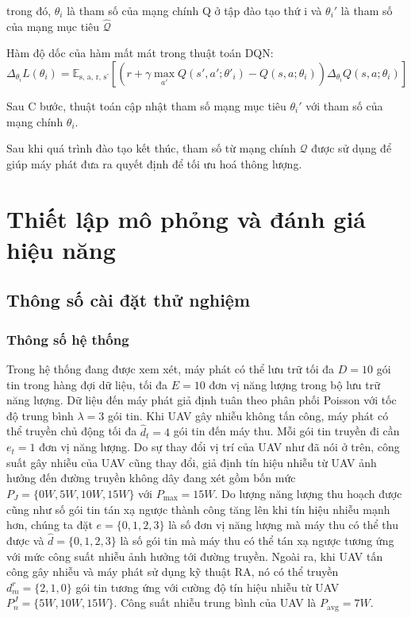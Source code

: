 \documentclass{uetgraduation}
\begin{document}
trong đó, $\theta_i$ là tham số của mạng chính Q ở tập đào tạo thứ i và $\theta_i'$ là tham số của mạng mục tiêu $\hat{\mathcal{Q}}$

Hàm độ dốc của hàm mất mát trong thuật toán DQN:
\begin{equation}
    \Delta_{\theta_i} L(\theta_i) = \mathbb{E}_\text{s, a, r, s'} [(r + \gamma \max_{a'} Q(s', a'; \theta'_i) - Q(s, a; \theta_i)) \Delta_{\theta_i} Q(s, a; \theta_i)] 
\end{equation}

Sau C bước, thuật toán cập nhật tham số mạng mục tiêu $\theta_i'$ với tham số của mạng chính $\theta_i$.

Sau khi quá trình đào tạo kết thúc, tham số từ mạng chính $\mathcal{Q}$ được sử dụng để giúp máy phát đưa ra quyết định để tối ưu hoá thông lượng.

\chapter{Thiết lập mô phỏng và đánh giá hiệu năng}
\section{Thông số cài đặt thử nghiệm}
\subsection{Thông số hệ thống}
Trong hệ thống đang được xem xét, máy phát có thể lưu trữ tối đa $D = 10$ gói tin trong hàng đợi dữ liệu, tối đa $E = 10$ đơn vị năng lượng
trong bộ lưu trữ năng lượng. Dữ liệu đến máy phát giả định tuân theo phân phối Poisson với tốc độ trung bình $\lambda = 3$ 
gói tin. Khi UAV gây nhiễu không tấn công, máy phát có thể truyền chủ động tối đa $\hat{d}_t = 4$ gói tin đến máy thu. Mỗi gói tin truyền đi cần
$e_t = 1$ đơn vị năng lượng. Do sự thay đổi vị trí của UAV như đã nói ở trên, công suất gây nhiễu của UAV cũng thay đổi, giả định tín hiệu nhiễu từ 
UAV ảnh hưởng đến đường truyền không dây đang xét gồm bốn mức $P_J = \{0W, 5W, 10W, 15W\}$ với $P_{\text{max}} = 15W$. Do lượng năng lượng
thu hoạch được cũng như số gói tin tán xạ ngược thành công tăng lên khi tín hiệu nhiễu mạnh hơn, chúng ta đặt $e = \{0, 1, 2, 3\}$ là số đơn vị
năng lượng mà máy thu có thể thu được và $\hat{d} = \{0, 1, 2, 3\}$ là số gói tin mà máy thu có thể tán xạ ngược tương ứng với mức công suất nhiễu
ảnh hưởng tới đường truyền. Ngoài ra, khi UAV tấn công gây nhiễu và máy phát sử dụng kỹ thuật RA, nó có thể truyền $d^r_m = \{2, 1, 0\}$ gói tin
tương ứng với cường độ tín hiệu nhiễu từ UAV $P^J_n = \{5W, 10W, 15W\}$. Công suất nhiễu trung bình của UAV là $P_\text{avg} = 7W$.
\end{document}

